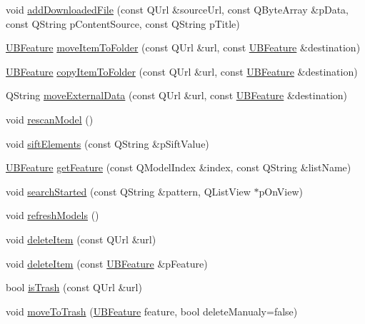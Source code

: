 \begin{DoxyCompactItemize}
void \hyperlink{class_u_b_features_controller_a36791ecaf11ce57e9844374ddf18c030}{add\-Downloaded\-File} (const Q\-Url \&source\-Url, const Q\-Byte\-Array \&p\-Data, const Q\-String p\-Content\-Source, const Q\-String p\-Title)
\item 
\hyperlink{class_u_b_feature}{U\-B\-Feature} \hyperlink{class_u_b_features_controller_ae655071d7b00474e3d194a9b0dc3da3e}{move\-Item\-To\-Folder} (const Q\-Url \&url, const \hyperlink{class_u_b_feature}{U\-B\-Feature} \&destination)
\item 
\hyperlink{class_u_b_feature}{U\-B\-Feature} \hyperlink{class_u_b_features_controller_a2553bf0f1523b4ce354205204acd9516}{copy\-Item\-To\-Folder} (const Q\-Url \&url, const \hyperlink{class_u_b_feature}{U\-B\-Feature} \&destination)
\item 
Q\-String \hyperlink{class_u_b_features_controller_af852c30775bb491b411d2886a6fd52eb}{move\-External\-Data} (const Q\-Url \&url, const \hyperlink{class_u_b_feature}{U\-B\-Feature} \&destination)
\item 
void \hyperlink{class_u_b_features_controller_aaab4bde109e0dd4186f668f1ff3a0a93}{rescan\-Model} ()
\item 
void \hyperlink{class_u_b_features_controller_a1ae7daa901929765eb70c6afdbad6063}{sift\-Elements} (const Q\-String \&p\-Sift\-Value)
\item 
\hyperlink{class_u_b_feature}{U\-B\-Feature} \hyperlink{class_u_b_features_controller_af0bdf0b0938b31e208e21fa24a0f6858}{get\-Feature} (const Q\-Model\-Index \&index, const Q\-String \&list\-Name)
\item 
void \hyperlink{class_u_b_features_controller_a40a6171b1075631cf17fe95ee3636d40}{search\-Started} (const Q\-String \&pattern, Q\-List\-View $\ast$p\-On\-View)
\item 
void \hyperlink{class_u_b_features_controller_af3e3b7af4e748b07feb1d3a58de82f8c}{refresh\-Models} ()
\item 
void \hyperlink{class_u_b_features_controller_a5b6f8bf56a0ddac3270956cd51a132cf}{delete\-Item} (const Q\-Url \&url)
\item 
void \hyperlink{class_u_b_features_controller_ac372e53b4e31eccd99520f4e28f4b7f9}{delete\-Item} (const \hyperlink{class_u_b_feature}{U\-B\-Feature} \&p\-Feature)
\item 
bool \hyperlink{class_u_b_features_controller_a9ad4f644682f545c2c8d9e41cd5dc9c5}{is\-Trash} (const Q\-Url \&url)
\item 
void \hyperlink{class_u_b_features_controller_abf82ec95b8742869c7463f968c584164}{move\-To\-Trash} (\hyperlink{class_u_b_feature}{U\-B\-Feature} feature, bool delete\-Manualy=false)

\end{DoxyCompactItemize}
